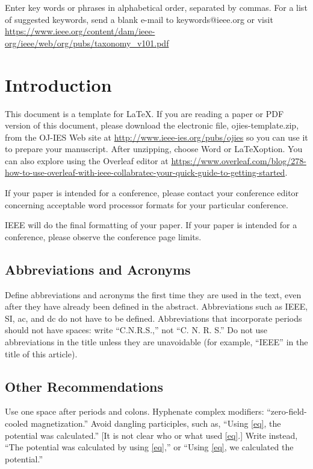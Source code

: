 \documentclass{ieeeojies}
\begin{document}
\begin{keywords}
Enter key words or phrases in alphabetical
order, separated by commas. For a list of suggested keywords, send a blank
e-mail to keywords@ieee.org or visit \underline
{https://www.ieee.org/content/dam/ieee-org/ieee/web/org/pubs/taxonomy\_v101.pdf}
\end{keywords}

\titlepgskip=-15pt

\maketitle

\section{Introduction}
\label{sec:introduction}
This document is a template for \LaTeX. If you are
reading a paper or PDF version of this document, please download the
electronic file, ojies-template.zip, from the OJ-IES Web site at \underline
{http://www.ieee-ies.org/pubs/ojies} so you can use it to prepare your manuscript. After unzipping, choose Word or \LaTeX option. You can also explore using the Overleaf editor at
\underline
{https://www.overleaf.com/blog/278-how-to-use-overleaf-}\break\underline{with-ieee-collabratec-your-quick-guide-to-getting-started}.

If your paper is intended for a conference, please contact your conference
editor concerning acceptable word processor formats for your particular
conference.

IEEE will do the final formatting of your paper. If your paper is intended
for a conference, please observe the conference page limits.

\subsection{Abbreviations and Acronyms}
Define abbreviations and acronyms the first time they are used in the text,
even after they have already been defined in the abstract. Abbreviations
such as IEEE, SI, ac, and dc do not have to be defined. Abbreviations that
incorporate periods should not have spaces: write ``C.N.R.S.,'' not ``C. N.
R. S.'' Do not use abbreviations in the title unless they are unavoidable
(for example, ``IEEE'' in the title of this article).

\subsection{Other Recommendations}
Use one space after periods and colons. Hyphenate complex modifiers:
``zero-field-cooled magnetization.'' Avoid dangling participles, such as,
``Using \eqref{eq}, the potential was calculated.'' [It is not clear who or what
used \eqref{eq}.] Write instead, ``The potential was calculated by using \eqref{eq},'' or
``Using \eqref{eq}, we calculated the potential.''
\end{document}
